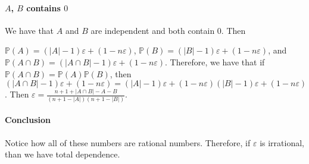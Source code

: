 \documentclass{article}
\theoremstyle{definition}
\numberwithin{theorem}{section}
\numberwithin{equation}{section}
\begin{document}
\paragraph{$A$, $B$ contains $0$}
We have that $A$ and $B$ are independent and both contain $0$. Then 

$\mathbb{P}(A) = (|A| - 1) \varepsilon + (1 - n \varepsilon)$, $\mathbb{P}(B) = (|B| - 1) \varepsilon + (1 - n \varepsilon)$, and $\mathbb{P}(A \cap B) = (|A \cap B| - 1) \varepsilon + (1 - n \varepsilon)$. Therefore, we have that if $\mathbb{P}(A \cap B) = \mathbb{P}(A)\mathbb{P}(B)$, then $(|A \cap B| - 1) \varepsilon + (1 - n \varepsilon) = (|A| - 1) \varepsilon + (1 - n \varepsilon)(|B| - 1) \varepsilon + (1 - n \varepsilon)$. Then $\varepsilon = \frac{n + 1 + |A \cap B| - A - B}{(n + 1 - |A|)(n + 1 - |B|)}$.
\paragraph{Conclusion}
Notice how all of these numbers are rational numbers. Therefore, if $\varepsilon$ is irrational, than we have total dependence.
\end{document}
